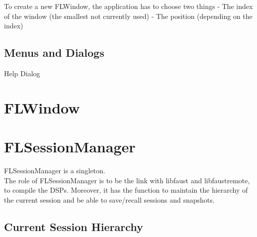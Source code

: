 \documentclass[a4paper]{article}
\begin{document}
To create a new FLWindow, the application has to choose two things
- The index of the window (the smallest not currently used)
- The position (depending on the index)

\subsection{Menus and Dialogs}

Help Dialog


\subsubsection{}
\section{FLWindow}

\section{FLSessionManager}

FLSessionManager is a singleton.\\

The role of FLSessionManager is to be the link with libfaust and libfaustremote, to compile the DSPs. Moreover, it has the function to maintain the hierarchy of the current session and be able to save/recall sessions and snapshots. 

\subsection{Current Session Hierarchy}
\end{document}
